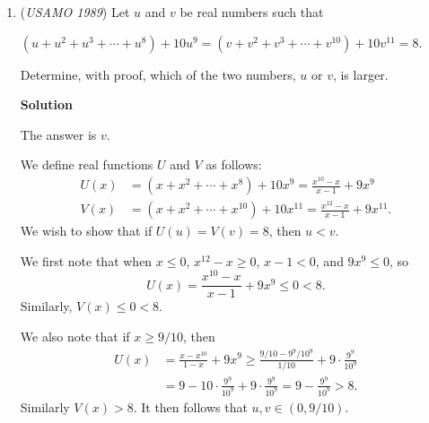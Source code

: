 \begin{enumerate}
 -sillybone

 



\textbf{Solution 2}

Consider the lines that pass through the circumcenter $O$. Extend $AO$, $BO$, $CO$ to $D$,$E$,$F$ on $a$,$b$,$c$, respectively.

 We notice that $IO$ passes through sides $a$ and $c$ if and only if $I$ belongs to either regions $AOF$ or $COD$.

 


 Since $AO = BO = CO = R$, we let $\alpha = \angle OAC = \angle OCA$, $\beta = \angle BAO = \angle ABO$, $\gamma = \angle BCO = \angle CBO$.

 We have $c < b < a\implies C < B < A\implies$ $\gamma+\alpha <\beta+\gamma <\alpha+\beta\implies\gamma <\alpha <\beta$

 Since $IA$ divides angle $A$ into two equal parts, it must be in the region marked by the $\beta$ of angle $A$, so $I$ is in $ABD$.

 Similarly, $I$ is in $ACF$ and $ABE$. Thus, $I$ is in their intersection, $AOF$. From above, we have $IO$ passes through $a$ and $c$. $\blacksquare$



	\item (\textit{USAMO 1989}) Let $u$ and $v$ be real numbers such that


 $(u + u^2 + u^3 + \cdots + u^8) + 10u^9 = (v + v^2 + v^3 + \cdots + v^{10}) + 10v^{11} = 8.$


 Determine, with proof, which of the two numbers, $u$ or $v$, is larger.


 



\textbf{Solution}

The answer is $v$.

 We define real functions $U$ and $V$ as follows:
 \begin{align*} U(x) &= (x+x^2 + \dotsb + x^8) + 10x^9 = \frac{x^{10}-x}{x-1} + 9x^9 \\ V(x) &= (x+x^2 + \dotsb + x^{10}) + 10x^{11} = \frac{x^{12}-x}{x-1} + 9x^{11} . \end{align*}
We wish to show that if $U(u)=V(v)=8$, then $u <v$.

 We first note that when $x \le 0$, $x^{12}-x \ge 0$, $x-1 < 0$, and $9x^9 \le 0$, so
 \[U(x) = \frac{x^{10}-x}{x-1} + 9x^9 \le 0 < 8 .\]Similarly, $V(x) \le 0 < 8$.

 We also note that if $x \ge 9/10$, then
 \begin{align*} U(x) &= \frac{x-x^{10}}{1-x} + 9x^9 \ge \frac{9/10 - 9^9/10^9}{1/10} + 9 \cdot \frac{9^{9}}{10^9} \\ &= 9 - 10 \cdot \frac{9^9}{10^9} + 9 \cdot \frac{9^9}{10^9} = 9 - \frac{9^9}{10^9} > 8. \end{align*}
Similarly $V(x) > 8$.  It then follows that $u, v \in (0,9/10)$.


\end{enumerate}
